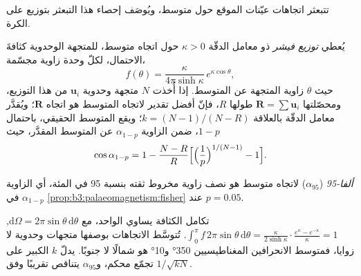 \begin{omfigure}
\par{}\label{fig:b3:palaeomagnetism:zijderveld}
\end{omfigure}

تتبعثر اتجاهات عيّنات الموقع حول متوسط، ويُوصَف إحصاء هذا التبعثر
بتوزيع على الكرة.

\begin{proposition}\label{prop:b3:palaeomagnetism:fisher}
يُعطي \emph{توزيع فيشر} ذو معامل الدقّة
$\kappa > 0$ حول اتجاه متوسط، للمتجهة الوحدوية
كثافةَ الاحتمال، لكلّ وحدة زاوية مجسّمة،
\[
  f(\theta) = \frac{\kappa}{4\pi\sinh\kappa}\,e^{\kappa\cos\theta},
\]
حيث $\theta$ زاوية المتجهة عن المتوسط. إذا أُخذت $N$ متجهة وحدوية $\mathbf u_i$
من هذا التوزيع، ومحصّلتها $\mathbf R = \sum\mathbf u_i$ طولها $R$، فإنّ
أفضل تقدير لاتجاه المتوسط هو اتجاه $\mathbf R$؛ ويُقدَّر معامل الدقّة
بالعلاقة $k = (N - 1)/(N - R)$؛ ويقع المتوسط الحقيقي، باحتمال
$1 - p$، ضمن الزاوية $\alpha_{1-p}$ عن المتوسط المقدَّر، حيث
\[
  \cos\alpha_{1-p} = 1 - \frac{N - R}{R}\Bigl[\Bigl(\frac1p\Bigr)^{1/(N-1)} - 1\Bigr].
\]
\end{proposition}
\admitted

\begin{definition}[ألفا-95]\label{def:b3:palaeomagnetism:a95}
\emph{ألفا-95} ($\alpha_{95}$) لاتجاه متوسط هو
نصف زاوية مخروط ثقته بنسبة 95 في المئة، أي الزاوية $\alpha_{1-p}$ في
\cref{prop:b3:palaeomagnetism:fisher} عند $p = 0.05$.
\end{definition}

تكامل الكثافة يساوي الواحد، مع $\mathrm d\Omega = 2\pi\sin\theta\,\mathrm
d\theta$, $\int_0^\pi f\,2\pi\sin\theta\,\mathrm d\theta =
\frac{\kappa}{2\sinh\kappa}\cdot\frac{e^\kappa - e^{-\kappa}}{\kappa} = 1$. تُتوسَّط الاتجاهات بوصفها متجهات
وحدوية لا زوايا، فمتوسط الانحرافين المغناطيسيين \ang{350} و\ang{10} هو
شمالًا لا جنوبًا. يدلّ $k$ الكبير على تجمّع محكم، و$\alpha_{95}$ يتناقص
تقريبًا وفق $1/\sqrt{kN}$.

